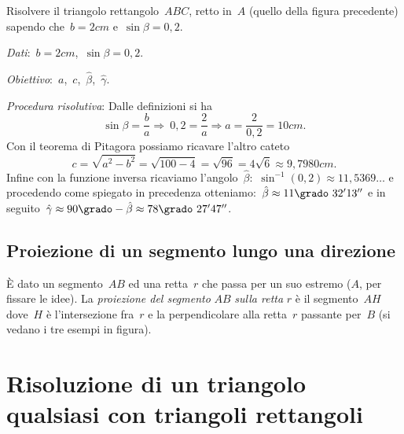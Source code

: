  \begin{esempio}
Risolvere il triangolo rettangolo~$ABC$, retto in~$A$ (quello della figura 
precedente) sapendo che~$b=2\unit{cm}$ e~$\sin \beta=0,2$.

\emph{Dati}:~$b=2\unit{cm}$,\quad~$\sin \beta=0,2$.

\emph{Obiettivo}:~$a$,\quad~$c$,\quad~${\hat{\beta}}$,\quad~${\hat{\gamma}}$.

\emph{Procedura risolutiva}:
Dalle definizioni si ha
\[\sin \beta=\frac{b}{a} \Rightarrow~0,2=\frac{2}{a}\Rightarrow 
a=\frac{2}{0,2}=10\unit{cm}.\]
Con il teorema di Pitagora possiamo ricavare l'altro cateto
\[c=\sqrt{a^{2}-b^{2}}=\sqrt{100-4}=\sqrt{96}=4\sqrt{6}\approx9,7980\unit{cm}.\]
Infine con la funzione inversa ricaviamo 
l'angolo~${\hat{\beta}}$:~$\sin^{-1}(0,2)\approx11,5369\ldots$ e procedendo 
come 
spiegato in
precedenza otteniamo:~${\hat{\beta}}\approx11\grado~32' 13''$ e in 
seguito~${\hat{\gamma}}\approx90\grado-{\hat{\beta}}\approx78\grado~27'47''$.
 \end{esempio}


\subsection{Proiezione di un segmento lungo una direzione}

È dato un segmento~$AB$ ed una retta~$r$ che passa per un suo estremo ($A$, per 
fissare le idee). La
\emph{proiezione del segmento} $AB$ \emph{sulla retta} $r$ è il segmento~$AH$ 
dove~$H$ è l'intersezione fra~$r$ e la
perpendicolare alla retta~$r$ passante per~$B$ (si vedano i tre esempi in 
figura).
\begin{inaccessibleblock}
\begin{center}
 
\end{center}
\end{inaccessibleblock}


\section{Risoluzione di un triangolo qualsiasi con triangoli rettangoli}
\label{sec:trigo_altritriangoli}

